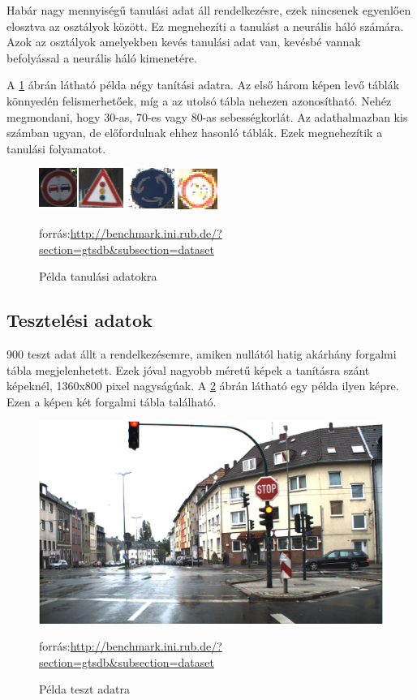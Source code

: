 Habár nagy mennyiségű tanulási adat áll rendelkezésre, ezek nincsenek egyenlően elosztva az osztályok között. Ez megnehezíti a tanulást a neurális háló számára. Azok az osztályok amelyekben kevés tanulási adat van, kevésbé vannak befolyással a neurális háló kimenetére. 

A \ref{fig:trainingImage} ábrán látható példa négy tanítási adatra. Az első három képen levő táblák könnyedén felismerhetőek, míg a az utolsó tábla nehezen azonosítható. Nehéz megmondani, hogy 30-as, 70-es vagy 80-as sebességkorlát. Az adathalmazban kis számban ugyan, de előfordulnak ehhez hasonló táblák. Ezek megnehezítik a tanulási folyamatot.

\begin{figure}[h]
\centering
\includegraphics[scale=2]{images/train}
\caption{Példa tanulási adatokra}
\small forrás:\url{http://benchmark.ini.rub.de/?section=gtsdb&subsection=dataset}


\label{fig:trainingImage}
\end{figure}

\subsection{Tesztelési adatok}

900 teszt adat állt a rendelkezésemre, amiken nullától hatig akárhány forgalmi tábla megjelenhetett. Ezek jóval nagyobb méretű képek a tanításra szánt képeknél, 1360x800 pixel nagyságúak. A \ref{fig:testImage} ábrán látható egy példa ilyen képre. Ezen a képen két forgalmi tábla található.

\begin{figure}[h]
\centering

\includegraphics[scale=0.4]{testImage}
\caption{Példa teszt adatra}
\small forrás:\url{http://benchmark.ini.rub.de/?section=gtsdb&subsection=dataset}

\label{fig:testImage}
\end{figure}

